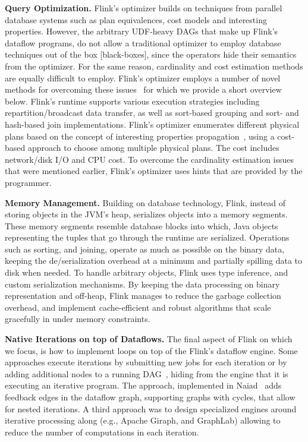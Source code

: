 \documentclass[11pt]{article}
\begin{document}
\textbf{Query Optimization.} Flink's optimizer builds on techniques from parallel database systems such as plan equivalences, cost models and interesting properties. However, the arbitrary UDF-heavy DAGs that make up Flink's dataflow programs, do not allow a traditional optimizer to employ database techniques out of the box [black-boxes], since the operators hide their semantics from the optimizer. For the same reason, cardinality and cost estimation methods are equally difficult to employ. Flink's optimizer employs a number of novel methods for overcoming these issues~\cite{blackBoxes, stratosphere, DBLP:journals/pvldb/EwenTKM12} for which we provide a short overview below. Flink's runtime supports various execution strategies including repartition/broadcast data transfer, as well as sort-based grouping and sort- and hash-based join implementations. Flink's optimizer enumerates different physical plans based on the concept of interesting properties propagation~\cite{scopeOptimizer}, using a cost-based approach to choose among multiple physical plans. The cost includes network/disk I/O and CPU cost. To overcome the cardinality estimation issues that were mentioned earlier, Flink's optimizer uses hints that are provided by the programmer.

\textbf{Memory Management.} Building on database technology, Flink, instead of storing objects in the JVM's heap, serializes objects into a  memory segments. These memory segments resemble database blocks into which, Java objects representing the tuples that go through the runtime are serialized. Operations such as sorting, and joining, operate as much as possible on the binary data, keeping the de/serialization overhead at a minimum and partially spilling data to disk when needed. To handle arbitrary objects, Flink uses type inference, and  custom serialization mechanisms.  By keeping the data processing on binary representation and off-heap, Flink manages to reduce the garbage collection overhead, and implement cache-efficient and robust algorithms that scale gracefully in under memory constraints.

\textbf{Native Iterations on top of Dataflows.} The final aspect of Flink on which we focus, is how to implement loops on top of the Flink's dataflow engine. Some approaches execute iterations by submitting new jobs for each iteration or by adding additional nodes to a running DAG~\cite{DBLP:journals/pvldb/BuHBE10, DBLP:conf/hotcloud/ZahariaCFSS10}, hiding from  the engine that it is executing an iterative program. The approach, implemented in Naiad~\cite{murray2013naiad} adds feedback edges in the dataflow graph, supporting graphs with cycles, that  allow for nested iterations. A third approach was to design specialized engines around iterative processing along (e.g., Apache Giraph, and GraphLab) allowing to reduce the number of computations in each iteration.~\cite{low2012distributed}
\end{document}
